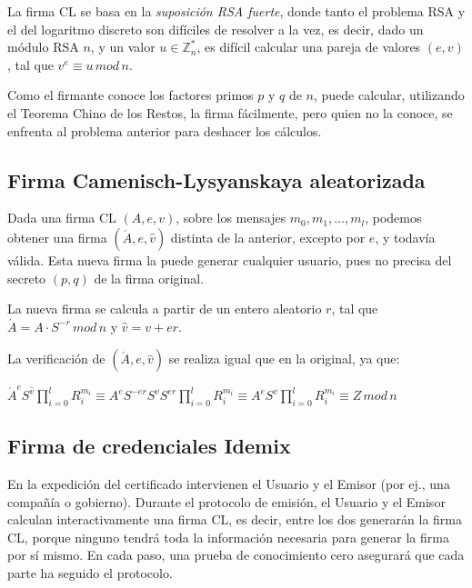 La firma CL se basa en la \textit{suposición RSA fuerte}, donde tanto el problema RSA y el del logaritmo discreto son difíciles de resolver a la vez, es decir, dado un módulo RSA $n$, y un valor $u\in \mathbb{Z}_n^*$, es difícil calcular una pareja de valores $(e,v)$, tal que $v^e \equiv u \, mod \, n$.



Como el firmante conoce los factores primos $p$ y $q$ de $n$, puede calcular, utilizando el Teorema Chino de los Restos, la firma fácilmente, pero quien no la conoce, se enfrenta al problema anterior para deshacer los cálculos.


\subsection{Firma Camenisch-Lysyanskaya aleatorizada}\label{CLrandomized}

Dada una firma CL $(A,e,v)$, sobre los mensajes  $m_0,m_1,\dots,m_l$, podemos obtener una firma $(\acute{A},e,\hat{v})$ distinta de la anterior, excepto por $e$, y todavía válida. Esta nueva firma la puede generar cualquier usuario, pues no precisa del secreto $(p,q)$ de la firma original.

La nueva firma se calcula a partir de un entero aleatorio $r$, tal que $\acute{A}= A\cdot S^{-r}\, mod\, n$ y $\hat{v}=v+er$.

La verificación de $(\acute{A},e,\hat{v})$ se realiza igual que en la original, ya que:

\begin{center}
	$
	\acute{A}^e S^{\hat{v}} \prod_{i=0}^{l} R_i^{m_i} \equiv A^e S^{-er} S^v S^{er} \prod_{i=0}^{l} R_i^{m_i} \equiv A^e S^v \prod_{i=0}^{l} R_i^{m_i} \equiv Z \, mod \, n
	$
\end{center}


\subsection{Firma de credenciales Idemix}

En la expedición del certificado intervienen el Usuario y el Emisor (por ej., una compañía o gobierno). Durante el protocolo de emisión, el Usuario y el Emisor calculan interactivamente una firma CL, es decir, entre los dos generarán la firma CL, porque ninguno tendrá toda la información necesaria para generar la firma por sí mismo. En cada paso, una prueba de conocimiento cero asegurará que cada parte ha seguido el protocolo.

